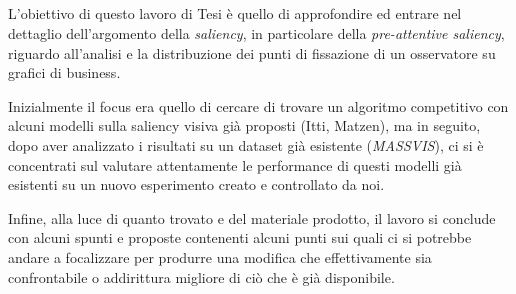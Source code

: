 \documentclass[%
	corpo=12pt,
    twoside,
    stile=classica,
    oldstyle,
    tipotesi=custom,
    greek,
    evenboxes,
]{toptesi}
\begin{document}


\ifclassica%
{\begin{dedica}
     
\end{dedica}

{}
\\\\
\\\\
L'obiettivo di questo lavoro di Tesi è quello di approfondire ed entrare nel dettaglio dell'argomento della \textit{saliency}, in particolare della \textit{pre-attentive saliency}, riguardo all'analisi e la distribuzione dei punti di fissazione di un osservatore su grafici di business.

Inizialmente il focus era quello di cercare di trovare un algoritmo competitivo con alcuni modelli sulla saliency visiva già proposti (Itti, Matzen), ma in seguito, dopo aver analizzato i risultati su un dataset già esistente (\textit{MASSVIS}), ci si è concentrati sul valutare attentamente le performance di questi modelli già esistenti su un nuovo esperimento creato e controllato da noi. 

Infine, alla luce di quanto trovato e del materiale prodotto, il lavoro si conclude con alcuni spunti e proposte contenenti alcuni punti sui quali ci si potrebbe andare a focalizzare per produrre una modifica che effettivamente sia confrontabile o addirittura migliore di ciò che è già disponibile. 




\tablespagetrue\figurespagetrue%

}
\end{document}
